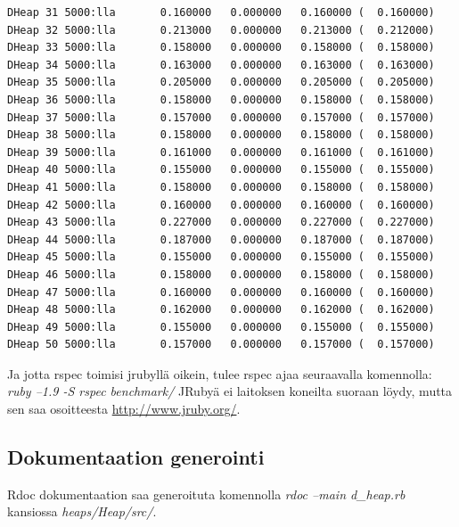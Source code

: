 \documentclass[a4paper,12pt]{article}
\begin{document}
\begin{verbatim}
DHeap 31 5000:lla       0.160000   0.000000   0.160000 (  0.160000)
DHeap 32 5000:lla       0.213000   0.000000   0.213000 (  0.212000)
DHeap 33 5000:lla       0.158000   0.000000   0.158000 (  0.158000)
DHeap 34 5000:lla       0.163000   0.000000   0.163000 (  0.163000)
DHeap 35 5000:lla       0.205000   0.000000   0.205000 (  0.205000)
DHeap 36 5000:lla       0.158000   0.000000   0.158000 (  0.158000)
DHeap 37 5000:lla       0.157000   0.000000   0.157000 (  0.157000)
DHeap 38 5000:lla       0.158000   0.000000   0.158000 (  0.158000)
DHeap 39 5000:lla       0.161000   0.000000   0.161000 (  0.161000)
DHeap 40 5000:lla       0.155000   0.000000   0.155000 (  0.155000)
DHeap 41 5000:lla       0.158000   0.000000   0.158000 (  0.158000)
DHeap 42 5000:lla       0.160000   0.000000   0.160000 (  0.160000)
DHeap 43 5000:lla       0.227000   0.000000   0.227000 (  0.227000)
DHeap 44 5000:lla       0.187000   0.000000   0.187000 (  0.187000)
DHeap 45 5000:lla       0.155000   0.000000   0.155000 (  0.155000)
DHeap 46 5000:lla       0.158000   0.000000   0.158000 (  0.158000)
DHeap 47 5000:lla       0.160000   0.000000   0.160000 (  0.160000)
DHeap 48 5000:lla       0.162000   0.000000   0.162000 (  0.162000)
DHeap 49 5000:lla       0.155000   0.000000   0.155000 (  0.155000)
DHeap 50 5000:lla       0.157000   0.000000   0.157000 (  0.157000)
\end{verbatim}
\normalsize
Ja jotta rspec toimisi jrubyllä oikein, tulee rspec ajaa seuraavalla komennolla: \emph{ruby --1.9 -S rspec benchmark/}
JRubyä ei laitoksen koneilta suoraan löydy, mutta sen saa osoitteesta  \url{http://www.jruby.org/}.

\subsection{Dokumentaation generointi}
Rdoc dokumentaation saa generoituta komennolla \emph{rdoc --main d\_heap.rb} kansiossa  \emph{heaps/Heap/src/}.
\end{document}
